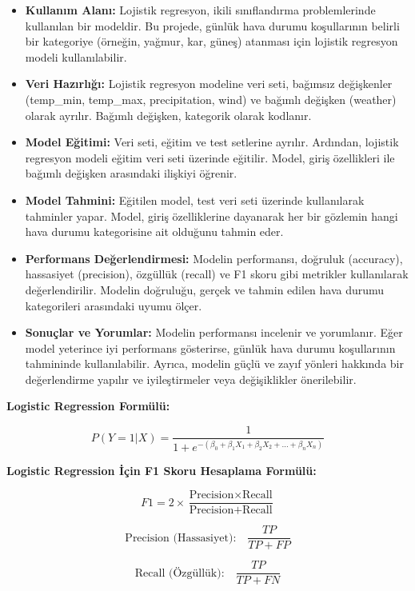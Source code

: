 \documentclass[twocolumn]{article}
\begin{document}
	\begin{itemize}
		\item \textbf{Kullanım Alanı:} Lojistik regresyon, ikili sınıflandırma problemlerinde kullanılan bir modeldir. Bu projede, günlük hava durumu koşullarının belirli bir kategoriye (örneğin, yağmur, kar, güneş) atanması için lojistik regresyon modeli kullanılabilir.
		\item \textbf{Veri Hazırlığı:} Lojistik regresyon modeline veri seti, bağımsız değişkenler (temp\_min, temp\_max, precipitation, wind) ve bağımlı değişken (weather) olarak ayrılır. Bağımlı değişken, kategorik olarak kodlanır.
		\item \textbf{Model Eğitimi:} Veri seti, eğitim ve test setlerine ayrılır. Ardından, lojistik regresyon modeli eğitim veri seti üzerinde eğitilir. Model, giriş özellikleri ile bağımlı değişken arasındaki ilişkiyi öğrenir.
		\item \textbf{Model Tahmini:} Eğitilen model, test veri seti üzerinde kullanılarak tahminler yapar. Model, giriş özelliklerine dayanarak her bir gözlemin hangi hava durumu kategorisine ait olduğunu tahmin eder.
		\item \textbf{Performans Değerlendirmesi:} Modelin performansı, doğruluk (accuracy), hassasiyet (precision), özgüllük (recall) ve F1 skoru gibi metrikler kullanılarak değerlendirilir. Modelin doğruluğu, gerçek ve tahmin edilen hava durumu kategorileri arasındaki uyumu ölçer.
		\item \textbf{Sonuçlar ve Yorumlar:} Modelin performansı incelenir ve yorumlanır. Eğer model yeterince iyi performans gösterirse, günlük hava durumu koşullarının tahmininde kullanılabilir. Ayrıca, modelin güçlü ve zayıf yönleri hakkında bir değerlendirme yapılır ve iyileştirmeler veya değişiklikler önerilebilir.
		
	\end{itemize}
	
	\textbf{Logistic Regression Formülü:} \cite{omu_logistic_regression}
	
	\[ P(Y=1|X) = \frac{1}{1 + e^{-(\beta_0 + \beta_1 X_1 + \beta_2 X_2 + \ldots + \beta_n X_n)}} \]
	
	\textbf{Logistic Regression İçin F1 Skoru Hesaplama Formülü:}
	
	\[ F1 = 2 \times \frac{\text{Precision} \times \text{Recall}}{\text{Precision} + \text{Recall}} \]
	
	\[ \text{Precision (Hassasiyet):} \quad \frac{TP}{TP + FP} \]
	
	\[ \text{Recall (Özgüllük):} \quad \frac{TP}{TP + FN} \]
	
\end{document}
